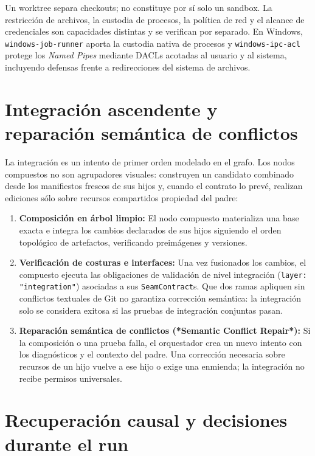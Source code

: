 Un worktree separa checkouts; no constituye por sí solo un sandbox. La
restricción de archivos, la custodia de procesos, la política de red y el
alcance de credenciales son capacidades distintas y se verifican por separado.
En Windows, \texttt{windows-job-runner} aporta la custodia nativa de procesos y
\texttt{windows-ipc-acl} protege los \emph{Named Pipes} mediante DACLs acotadas
al usuario y al sistema, incluyendo defensas frente a redirecciones del sistema
de archivos.

\section{Integración ascendente y reparación semántica de conflictos}
\label{sec:integracion-ascendente}

La integración es un intento de primer orden modelado en el grafo. Los nodos
compuestos no son agrupadores visuales: construyen un candidato combinado desde
los manifiestos frescos de sus hijos y, cuando el contrato lo prevé, realizan
ediciones sólo sobre recursos compartidos propiedad del padre:

\begin{enumerate}
  \item \textbf{Composición en árbol limpio:} El nodo compuesto materializa una base exacta e integra los cambios declarados de sus hijos siguiendo el orden topológico de artefactos, verificando preimágenes y versiones.
  \item \textbf{Verificación de costuras e interfaces:} Una vez fusionados los cambios, el compuesto ejecuta las obligaciones de validación de nivel integración (\texttt{layer: "integration"}) asociadas a sus \texttt{SeamContract}s. Que dos ramas apliquen sin conflictos textuales de Git no garantiza corrección semántica: la integración solo se considera exitosa si las pruebas de integración conjuntas pasan.
  \item \textbf{Reparación semántica de conflictos (*Semantic Conflict Repair*):} Si la composición o una prueba falla, el orquestador crea un nuevo intento con los diagnósticos y el contexto del padre. Una corrección necesaria sobre recursos de un hijo vuelve a ese hijo o exige una enmienda; la integración no recibe permisos universales.
\end{enumerate}

\section{Recuperación causal y decisiones durante el run}

